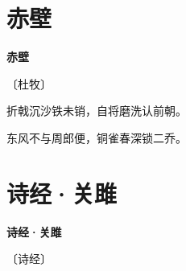 \documentclass[12pt,UTF-8,openany,fontset=none]{ctexbook}
\begin{document}
\vspace{8pt}
\clearpage

\section{赤壁}


\begin{center}
    {\bfseries 赤壁}

    \vspace{18pt}

    \begin{large}\xuwen
        〔杜牧〕
    \end{large}

\end{center}

    \vspace{18pt}  %

\begin{center}
    \begin{Large}

        折戟沉沙铁未销，自将磨洗认前朝。

        东风不与周郎便，铜雀春深锁二乔。

    \end{Large}

\end{center}

\vspace{8pt}
\clearpage

\section{诗经·关雎}


\begin{center}
    {\bfseries 诗经·关雎}

    \vspace{18pt}

    \begin{large}\xuwen
        〔诗经〕
    \end{large}

\end{center}

    \vspace{18pt}  %
\end{document}
